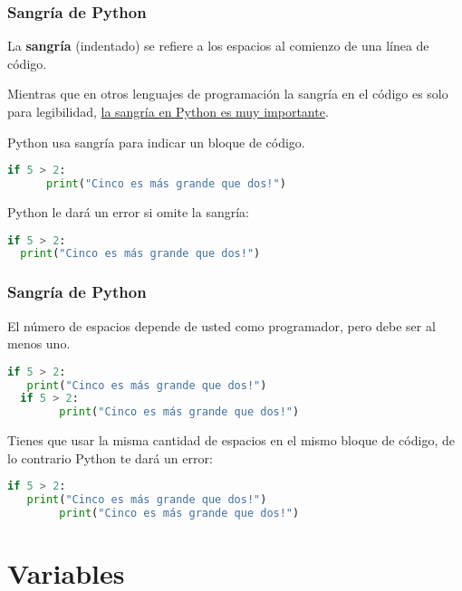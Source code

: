 \begin{frame}[fragile]
  \frametitle{Sangría de Python}

  \vspace{\baselineskip}
  La \textbf{sangría} (indentado) se refiere a los espacios al comienzo
  de una línea de código.

  \vspace{\baselineskip}
  Mientras que en otros lenguajes de programación la sangría en el código
  es solo para legibilidad, \underline{la sangría en Python es muy
  importante}.

  \vspace{\baselineskip}
  Python usa sangría para indicar un bloque de código.
  \begin{lstlisting}[language=Python]
  if 5 > 2:
      print("Cinco es más grande que dos!")
  \end{lstlisting}

  Python le dará un error si omite la sangría:
  \begin{lstlisting}[language=Python]
  if 5 > 2:
  print("Cinco es más grande que dos!")
  \end{lstlisting}

\end{frame}


\begin{frame}[fragile]
  \frametitle{Sangría de Python}

  \vspace{\baselineskip}
  El número de espacios depende de usted como programador,
  pero debe ser al menos uno.

  \vspace{\baselineskip}
  \begin{lstlisting}[language=Python]
  if 5 > 2:
   print("Cinco es más grande que dos!")
  if 5 > 2:
        print("Cinco es más grande que dos!")
  \end{lstlisting}

  Tienes que usar la misma cantidad de espacios en el mismo bloque
  de código, de lo contrario Python te dará un error:

  \vspace{\baselineskip}
  \begin{lstlisting}[language=Python]
  if 5 > 2:
   print("Cinco es más grande que dos!")
        print("Cinco es más grande que dos!")
  \end{lstlisting}
\end{frame}


\section{Variables}

